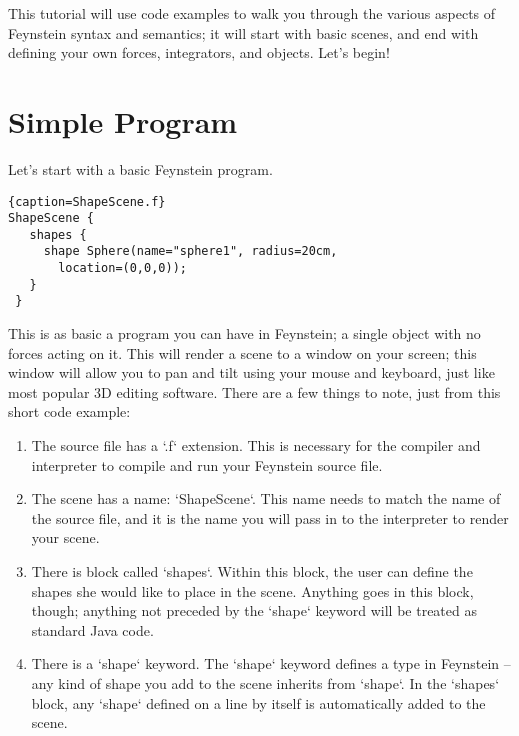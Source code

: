 \documentclass[letterpaper]{article}
\begin{document}
This tutorial will use code examples to walk you through the various
aspects of Feynstein syntax and semantics; it will start with basic
scenes, and end with defining your own forces, integrators, and
objects. Let's begin!

\newpage
\section{Simple Program}

Let's start with a basic Feynstein program.

\begin{lstlisting}{caption=ShapeScene.f}
ShapeScene {
   shapes {
     shape Sphere(name="sphere1", radius=20cm, 
       location=(0,0,0));
   }
 }
\end{lstlisting}

This is as basic a program you can have in Feynstein; a single object
with no forces acting on it. This will render a scene to a window on
your screen; this window will allow you to pan and tilt using your
mouse and keyboard, just like most popular 3D editing software. There
are a few things to note, just from this short code example:

\begin{enumerate}
\item The source file has a `.f` extension. This is necessary
  for the compiler and interpreter to compile and run your Feynstein
  source file.
\item The scene has a name: `ShapeScene`. This name needs
  to match the name of the source file, and it is the name you will
  pass in to the interpreter to render your scene.
\item There is block called `shapes`. Within this block, the user can
  define the shapes she would like to place in the scene. Anything
  goes in this block, though; anything not preceded by the `shape`
  keyword will be treated as standard Java code.
\item There is a `shape` keyword. The `shape` keyword defines a type
  in Feynstein -- any kind of shape you add to the scene inherits from
  `shape`. In the `shapes` block, any `shape` defined on a line by
  itself is automatically added to the scene.
\end{enumerate}
\end{document}
